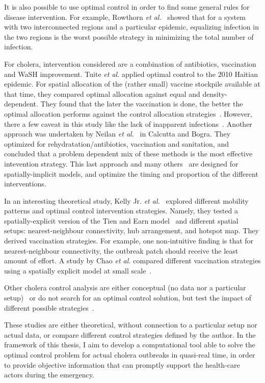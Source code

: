 It is also possible to use optimal control in order to find some general rules for disease intervention. For example, Rowthorn \textit{et al.}~\cite{rowthorn_optimal_2009} showed that for a system with two interconnected regions and a particular epidemic, equalizing infection in the two regions is the worst possible strategy in minimizing the total number of infection.

For cholera, intervention considered are a combination of antibiotics, vaccination and WaSH improvement. Tuite \textit{et al.} applied optimal control to the 2010 Haitian epidemic. For spatial allocation of the (rather small) vaccine stockpile available at that time, they compared optimal allocation against equal and density-dependent. They found that the later the vaccination is done, the better the optimal allocation performs against the control allocation strategies~\cite{tuite_cholera_2011}. However, there a few caveat in this study like the lack of inapparent infections~\cite{king_inapparent_2008, rinaldo_reassessment_2012}. Another approach was undertaken by Neilan \textit{et al.}~\cite{millerneilan_modeling_2010} in Calcutta and Bogra. They optimized for rehydratation/antibiotics, vaccination and sanitation, and concluded that a problem dependent mix of these methods is the most effective intevention strategy. This last approach and many others~\cite{sardar_optimal_2013} are designed for spatially-implicit models, and optimize the timing and proportion of the different interventions.

In an interesting theoretical study, Kelly Jr. \textit{et al.}~\cite{kelly_impact_2016} explored different mobility patterns and  optimal control intervention strategies. Namely, they tested a spatially-explicit version of the Tien and Earn model~\cite{tien_multiple_2010} and different spatial setups: nearest-neighbour connectivity, hub arrangement, and  hotspot map. They derived vaccination strategies. For example, one non-intuitive finding is that for nearest-neighbour connectivity, the outbreak patch should receive the least amount of effort.  A study by Chao \textit{et al.} compared different vaccination strategies using a spatially explicit model at small scale~\cite{chao_vaccination_2011}.  

Other cholera control analysis are either conceptual (no data nor a particular setup)~\cite{fister_optimal_2016} or do not search for an optimal control solution, but test the impact of different possible  strategies~\cite{kirpich_controlling_2017, eubank_modelling_2004, finger_potential_2018, seidlein_preventing_2018,azman_micro-hotspots_2018,lessler_mapping_2018,rebaudet_dry_2013}.

These studies are either theoretical, without connection to a particular setup nor actual data, or compare different control strategies defined by the author. In the framework of this thesis, I aim to develop a computational tool able to solve the optimal control problem for actual cholera outbreaks in quasi-real time, in order to provide objective information that can promptly support the health-care actors during the emergency. 
